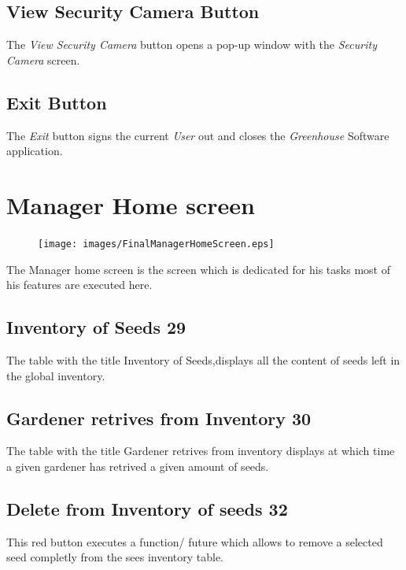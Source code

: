 \subsection{View Security Camera Button}
The \emph{View Security Camera} button opens a pop-up window with the
\emph{Security Camera} screen.

\subsection{Exit Button}
The \emph{Exit} button signs the current \emph{User} out and closes the
\emph{Greenhouse} Software application.











\section{Manager Home screen}
\label{sec:appendix_Manager_Home_Screen}

\begin{figure}[H]
\texttt{[image: images/FinalManagerHomeScreen.eps]}
\end{figure}

The Manager home screen is the screen which is dedicated for his tasks most of
his features are executed here.


\subsection{Inventory of Seeds 29}
The table with the title Inventory of Seeds,displays all the content of seeds
left in the global inventory.

\subsection{Gardener retrives from Inventory 30}
The table with the title Gardener retrives from inventory displays at which time
a given gardener has retrived a given amount of seeds.

\subsection{Delete from Inventory of seeds 32}
This red button executes a function/ future which allows to remove a selected
seed completly from the sees inventory table.

